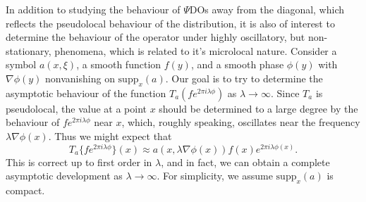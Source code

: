 In addition to studying the behaviour of $\Psi$DOs away from the diagonal, which reflects the pseudolocal behaviour of the distribution, it is also of interest to determine the behaviour of the operator under highly oscillatory, but non-stationary, phenomena, which is related to it's microlocal nature. Consider a symbol $a(x,\xi)$, a smooth function $f(y)$, and a smooth phase $\phi(y)$ with $\nabla \phi(y)$ nonvanishing on $\text{supp}_x(a)$. Our goal is to try to determine the asymptotic behaviour of the function $T_a(f e^{2 \pi i \lambda \phi})$ as $\lambda \to \infty$. Since $T_a$ is pseudolocal, the value at a point $x$ should be determined to a large degree by the behaviour of $f e^{2 \pi i \lambda \phi}$ near $x$, which, roughly speaking, oscillates near the frequency $\lambda \nabla \phi(x)$. Thus we might expect that
%
\[ T_a \{ f e^{2 \pi i \lambda \phi} \} (x) \approx a(x,\lambda \nabla \phi(x)) f(x) e^{2 \pi i \lambda \phi(x)}. \]
%
This is correct up to first order in $\lambda$, and in fact, we can obtain a complete asymptotic development as $\lambda \to \infty$. For simplicity, we assume $\text{supp}_x(a)$ is compact.

